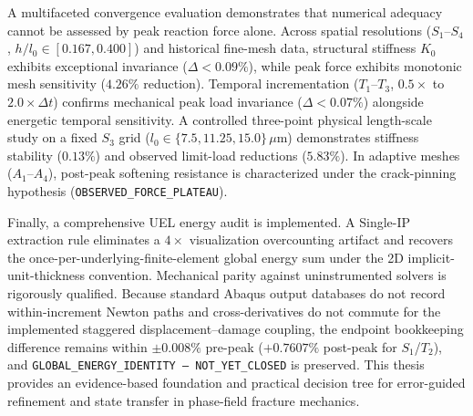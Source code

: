A multifaceted convergence evaluation demonstrates that numerical adequacy cannot be assessed by peak reaction force alone. Across spatial resolutions ($S_1$--$S_4$, $h/l_0 \in [0.167, 0.400]$) and historical fine-mesh data, structural stiffness $K_0$ exhibits exceptional invariance ($\Delta < 0.09\%$), while peak force exhibits monotonic mesh sensitivity ($4.26\%$ reduction). Temporal incrementation ($T_1$--$T_3$, $0.5\times$ to $2.0\times\Delta t$) confirms mechanical peak load invariance ($\Delta < 0.07\%$) alongside energetic temporal sensitivity. A controlled three-point physical length-scale study on a fixed $S_3$ grid ($l_0 \in \{7.5, 11.25, 15.0\}\,\mu\text{m}$) demonstrates stiffness stability ($0.13\%$) and observed limit-load reductions ($5.83\%$). In adaptive meshes ($A_1$--$A_4$), post-peak softening resistance is characterized under the crack-pinning hypothesis (\texttt{OBSERVED\_FORCE\_PLATEAU}).

Finally, a comprehensive UEL energy audit is implemented. A Single-IP extraction rule eliminates a $4\times$ visualization overcounting artifact and recovers the once-per-underlying-finite-element global energy sum under the 2D implicit-unit-thickness convention. Mechanical parity against uninstrumented solvers is rigorously qualified. Because standard Abaqus output databases do not record within-increment Newton paths and cross-derivatives do not commute for the implemented staggered displacement--damage coupling, the endpoint bookkeeping difference remains within $\pm0.008\%$ pre-peak ($+0.7607\%$ post-peak for $S_1$/$T_2$), and \texttt{GLOBAL\_ENERGY\_IDENTITY --- NOT\_YET\_CLOSED} is preserved. This thesis provides an evidence-based foundation and practical decision tree for error-guided refinement and state transfer in phase-field fracture mechanics.

